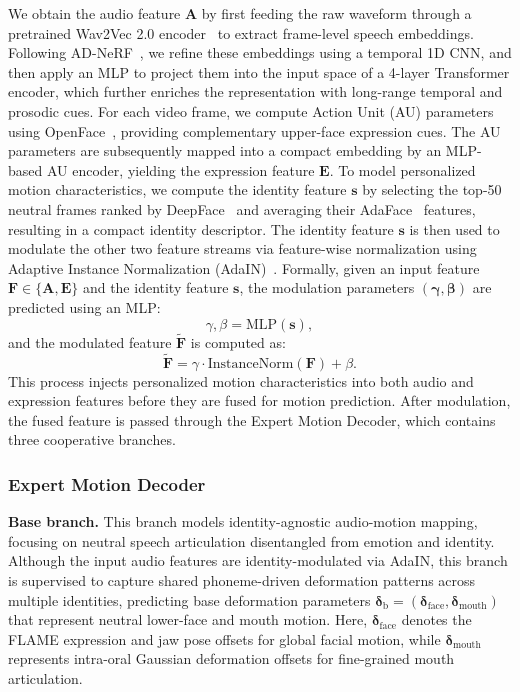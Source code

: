 We obtain the audio feature $\mathbf{A}$ by first feeding the raw waveform through a pretrained Wav2Vec 2.0 encoder~\cite{baevski2020wav2vec} to extract frame-level speech embeddings. Following AD-NeRF~\cite{guo_ad-nerf_2021}, we refine these embeddings using a temporal 1D CNN, and then apply an MLP to project them into the input space of a 4-layer Transformer encoder, which further enriches the representation with long-range temporal and prosodic cues.
For each video frame, we compute Action Unit (AU) parameters using OpenFace~\cite{baltruvsaitis2015cross,8373812}, providing complementary upper-face expression cues. The AU parameters are subsequently mapped into a compact embedding by an MLP-based AU encoder, yielding the expression feature $\mathbf{E}$. 
To model personalized motion characteristics, we compute the identity feature $\mathbf{s}$ by selecting the top-50 neutral frames ranked by DeepFace~\cite{serengil2024lightface} and averaging their AdaFace~\cite{kim2022adaface} features, resulting in a compact identity descriptor.
The identity feature $\mathbf{s}$ is then used to modulate the other two feature streams via feature-wise normalization using Adaptive Instance Normalization (AdaIN)~\cite{huang2017arbitrary, karras2019style}.
Formally, given an input feature $\mathbf{F} \in \{\mathbf{A}, \mathbf{E}\}$ and the identity feature $\mathbf{s}$, the modulation parameters $(\boldsymbol{\gamma}, \boldsymbol{\beta})$ are predicted using an MLP:
\begin{equation}
\gamma, \beta = \mathrm{MLP}(\mathbf{s}),
\end{equation}
and the modulated feature $\tilde{\mathbf{F}}$ is computed as:
\begin{equation}
\tilde{\mathbf{F}} = \gamma \cdot \mathrm{InstanceNorm}(\mathbf{F}) + \beta.
\label{eq:adain}
\end{equation}
This process injects personalized motion characteristics into both audio and expression features before they are fused for motion prediction. After modulation, the fused feature is passed through the Expert Motion Decoder, which contains three cooperative branches.


\subsubsection{Expert Motion Decoder}
\label{sec:decoder}
\noindent \textbf{Base branch.}
This branch models identity-agnostic audio-motion mapping, focusing on neutral speech articulation disentangled from emotion and identity. Although the input audio features are identity-modulated via AdaIN, this branch is supervised to capture shared phoneme-driven deformation patterns across multiple identities, predicting base deformation parameters ${\boldsymbol{\delta}}_{\text{b}}=(\boldsymbol{\delta}_{\text{face}}, \boldsymbol{\delta}_{\text{mouth}})$ that represent neutral lower-face and mouth motion. Here, \(\boldsymbol{\delta}_{\text{face}}\) denotes the FLAME expression and jaw pose offsets for global facial motion, while \(\boldsymbol{\delta}_{\text{mouth}}\) represents intra-oral Gaussian deformation offsets for fine-grained mouth articulation.


